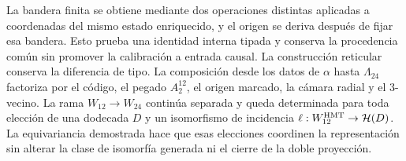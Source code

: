 La bandera finita se obtiene mediante dos operaciones distintas aplicadas a
coordenadas del mismo estado enriquecido, y el origen se deriva después de
fijar esa bandera. Esto prueba una identidad interna tipada y conserva la
procedencia común sin promover la calibración a entrada causal. La
construcción reticular conserva la diferencia de tipo. La composición desde
los datos de \(\alpha\) hasta \(\Lambda_{24}\) factoriza por el código, el
pegado \(A_2^{12}\), el origen marcado, la cámara radial y el 3-vecino. La
rama \(W_{12}\to W_{24}\) continúa separada y queda determinada para toda
elección de una dodecada \(D\) y un isomorfismo de incidencia
\(\ell:W_{12}^{\rm HMT}\to\mathcal H(D)\). La equivariancia demostrada hace
que esas elecciones coordinen la representación sin alterar la clase de
isomorfía generada ni el cierre de la doble proyección.

